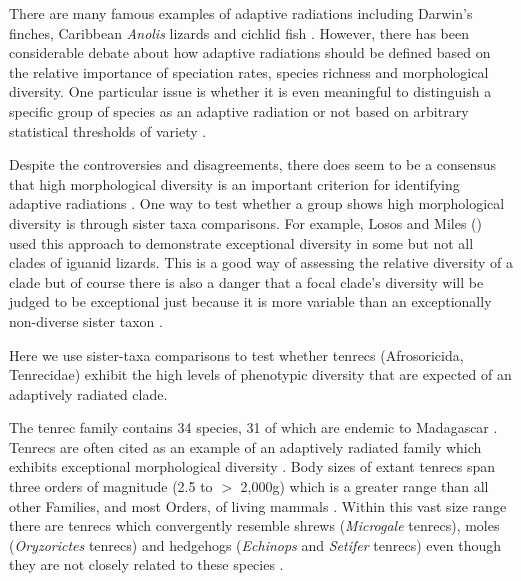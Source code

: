 \documentclass[12pt,a4paper]{article}
\begin{document}
	There are many famous examples of adaptive radiations including Darwin's finches, Caribbean \textit{Anolis} lizards and cichlid fish \citep{Gavrilets2009}. However, there has been considerable debate about how adaptive radiations should be defined \citep{Glor2010, Losos2010a} based on the relative importance of speciation rates, species richness and morphological diversity. One particular issue is whether it is even meaningful to distinguish a specific group of species as an adaptive radiation or not based on arbitrary statistical thresholds of variety \citep{Olson2009}.

	Despite the controversies and disagreements, there does seem to be a consensus that high morphological diversity is an important criterion for identifying adaptive radiations \citep{Losos2010a, Olson2009}. One way to test whether a group shows high morphological diversity is through sister taxa comparisons. For example, Losos and Miles (\citeyear{Losos2002}) used this approach to demonstrate exceptional diversity in some but not all clades of iguanid lizards. This is a good way of assessing the relative diversity of a clade but of course there is also a danger that a focal clade's diversity will be judged to be exceptional just because it is more variable than an exceptionally non-diverse sister taxon \citep{Losos2002}. 


	Here we use sister-taxa comparisons to test whether tenrecs (Afrosoricida, Tenrecidae) exhibit the high levels of phenotypic diversity that are expected of an adaptively radiated clade.


	The tenrec family contains 34 species, 31 of which are endemic to Madagascar \citep{Olson2013}. Tenrecs are often cited as an example of an adaptively radiated family which exhibits exceptional morphological diversity \citep{Soarimalala2011, Olson2003}. Body sizes of extant tenrecs span three orders of magnitude (2.5 to $>$ 2,000g) which is a greater range than all other Families, and most Orders, of living mammals \citep{Olson2003}.
	Within this vast size range there are tenrecs which convergently resemble shrews (\textit{Microgale} tenrecs), moles (\textit{Oryzorictes} tenrecs) and hedgehogs (\textit{Echinops} and \textit{Setifer} tenrecs) \citep{Eisenberg1969} even though they are not closely related to these species \citep{Stanhope1998}.
\end{document}
